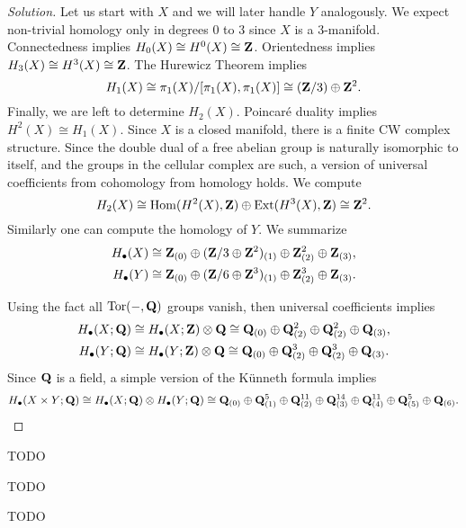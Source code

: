 \begin{proof}[Solution]
  Let us start with $X$ and we will later handle $Y$ analogously. We expect non-trivial homology only in degrees $0$ to $3$ since $X$ is a $3$-manifold. Connectedness implies $H_0(X) \cong H^0(X) \cong \mathbf{Z}$. Orientedness implies $H_3(X) \cong H^3(X) \cong \mathbf{Z}$. The Hurewicz Theorem implies
  \[
  H_1(X) \cong \pi_1(X)/[\pi_1(X),\pi_1(X)] \cong (\mathbf{Z}/3) \oplus \mathbf{Z}^2.
  \]
  Finally, we are left to determine $H_2(X)$. Poincar\'e duality implies $H^2(X) \cong H_1(X)$. Since $X$ is a closed manifold, there is a finite CW complex structure. Since the double dual of a free abelian group is naturally isomorphic to itself, and the groups in the cellular complex are such, a version of universal coefficients from cohomology from homology holds. We compute
  \[
  H_2(X) \cong
  \operatorname{Hom}(H^2(X),\mathbf{Z}) \oplus \operatorname{Ext}(H^3(X),\mathbf{Z}) \cong
  \mathbf{Z}^2.
  \]
  Similarly one can compute the homology of $Y$. We summarize
  \begin{align*}
    H_\bullet(X) &\cong \mathbf{Z}_{(0)} \oplus (\mathbf{Z}/3 \oplus \mathbf{Z}^2)_{(1)} \oplus \mathbf{Z}^2_{(2)} \oplus \mathbf{Z}_{(3)}, \\
    H_\bullet(Y) &\cong \mathbf{Z}_{(0)} \oplus (\mathbf{Z}/6 \oplus \mathbf{Z}^3)_{(1)} \oplus \mathbf{Z}^3_{(2)} \oplus \mathbf{Z}_{(3)}.
  \end{align*}
  
  Using the fact all $\operatorname{Tor}(-,\mathbf{Q})$ groups vanish, then universal coefficients implies
  \begin{align*}
    H_\bullet(X;\mathbf{Q})
    &\cong
    H_\bullet(X;\mathbf{Z}) \otimes \mathbf{Q} \cong
    \mathbf{Q}_{(0)} \oplus \mathbf{Q}^2_{(2)} \oplus \mathbf{Q}^2_{(2)} \oplus \mathbf{Q}_{(3)}, \\
    H_\bullet(Y;\mathbf{Q})
    &\cong
    H_\bullet(Y;\mathbf{Z}) \otimes \mathbf{Q} \cong
    \mathbf{Q}_{(0)} \oplus \mathbf{Q}^3_{(2)} \oplus \mathbf{Q}^3_{(2)} \oplus \mathbf{Q}_{(3)}.
  \end{align*}
  Since $\mathbf{Q}$ is a field, a simple version of the K\"unneth formula implies
  \[
  H_\bullet(X \times Y; \mathbf{Q}) \cong
  H_\bullet(X; \mathbf{Q}) \otimes H_\bullet(Y; \mathbf{Q}) \cong
  \mathbf{Q}_{(0)} \oplus \mathbf{Q}^5_{(1)} \oplus \mathbf{Q}^{11}_{(2)} \oplus \mathbf{Q}^{14}_{(3)} \oplus \mathbf{Q}^{11}_{(4)} \oplus \mathbf{Q}^5_{(5)} \oplus \mathbf{Q}_{(6)}. \qedhere
  \]
\end{proof}


TODO


TODO


TODO

